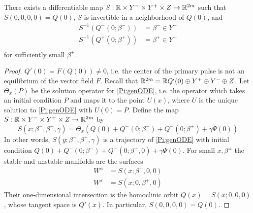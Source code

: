 \documentclass[thesis.tex]{subfiles}
\begin{document}
\begin{lemma}\label{straightenW}
There exists a differentiable map $S: {\mathbb R} \times Y^- \times Y^+ \times Z \rightarrow {\mathbb R}^{2m}$ such that $S(0, 0, 0, 0) = Q(0)$, $S$ is invertible in a neighborhood of $Q(0)$, and
\begin{align*}
S^{-1}(Q^-(0; \beta^-)) &= \beta^- \in Y^- \\
S^{-1}(Q^+(0; \beta^+)) &= \beta^+ \in Y^+ \\
\end{align*}
for sufficiently small $\beta^\pm$.
\begin{proof}
$Q'(0) = F(Q(0)) \neq 0$, i.e. the center of the primary pulse is not an equilibrium of the vector field $F$. Recall that ${\mathbb R}^{2m} = {\mathbb R} Q'(0) \oplus Y^+ \oplus Y^- \oplus Z$. Let $\Theta_x(P)$ be the solution operator for \eqref{Pi:genODE}, i.e. the operator which takes an initial condition $P$ and maps it to the point $U(x)$, where $U$ is the unique solution to \eqref{Pi:genODE} with $U(0) = P$. Define the map $S: {\mathbb R} \times Y^- \times Y^+ \times Z \rightarrow {\mathbb R}^{2m}$ by 
\begin{equation}\label{flowboxdefS}
S(x; \beta^-, \beta^+, \gamma) = \Theta_x\left(Q(0) + Q^-(0; \beta^-) + Q^-(0; \beta^+) + \gamma \Psi(0)\right)
\end{equation}
In other words, $S(y; \beta^-, \beta^+, \gamma)$ is a trajectory of \eqref{Pi:genODE} with initial condition $Q(0) + Q^-(0; \beta^-) + Q^-(0; \beta^+,0) + \gamma \Psi(0)$. For small $x, \beta^\pm$ the stable and unstable manifolds are the surfaces
\begin{align*}
W^u &= S(x; \beta^-, 0, 0) \\
W^s &= S(x; 0, \beta^+, 0) 
\end{align*}
Their one-dimensional intersection is the homoclinic orbit $Q(x) = S(x; 0, 0, 0)$, whose tangent space is $Q'(x)$. In particular, $S(0, 0, 0, 0) = Q(0)$.


\end{proof}
\end{lemma}
\end{document}
